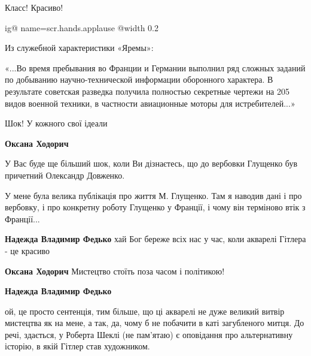  
 
 
 
 
\zzSecCmt

\begin{itemize} %
Класс! Красиво!


\ifcmt
  ig@ name=scr.hands.applause
  @width 0.2
\fi


Из служебной характеристики «Яремы»:

«...Во время пребывания во Франции и Германии выполнил ряд сложных заданий по
добыванию научно-технической информации оборонного характера. В результате
советская разведка получила полностью секретные чертежи на 205 видов военной
техники, в частности авиационные моторы для истребителей...»


Шок! У кожного свої ідеали

\begin{itemize} %
\textbf{Оксана Ходорич} 

У Вас буде ще більший шок, коли Ви дізнаєтесь, що до вербовки Глущенко був
причетний Олександр Довженко.

У мене була велика публікація про життя М. Глущенко. Там я наводив дані і про
вербовку, і про конкретну роботу Глущенко у Франції, і чому він терміново втік
з Франції...

\begin{itemize} %
\textbf{Надежда Владимир Федько} хай Бог береже всіх нас у час, коли акварелі Гітлера - це красиво

\textbf{Оксана Ходорич} Мистецтво стоїть поза часом і політикою!

\textbf{Надежда Владимир Федько} 

ой, це просто сентенція, тим більше, що ці акварелі не дуже великий витвір
мистецтва як на мене, а так, да, чому б не побачити в каті загубленого митця.
До речі, здається, у Роберта Шеклі (не пам'ятаю) є оповідання про альтернативну
історію, в якій Гітлер став художником.



\end{itemize}
\end{itemize}
\end{itemize}
